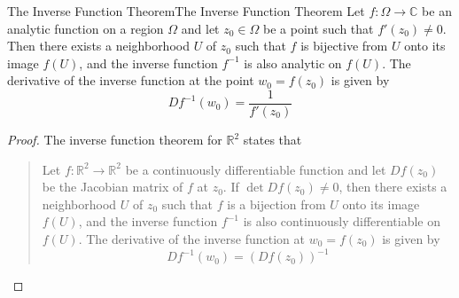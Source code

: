 \documentclass[../main.tex]{subfiles}
\begin{document}
\begin{theorem}{The Inverse Function Theorem}{The Inverse Function Theorem}
	Let $f: \Omega \rightarrow \mathbb{C}$ be an analytic function on a region $\Omega$ and let $z_0\in\Omega$ be a point such that $f'(z_0) \neq 0$. Then there exists a neighborhood $U$ of $z_0$ such that $f$ is bijective from $U$ onto its image $f(U)$, and the inverse function $f^{-1}$ is also analytic on $f(U)$. The derivative of the inverse function at the point $w_0 = f(z_0)$ is given by
	\begin{equation*}
		Df^{-1}(w_0) = \frac{1}{f'(z_0)}
	\end{equation*}
\end{theorem}
\begin{proof}
	The inverse function theorem for $\mathbb{R}^2$ states that
	\begin{quote}
		Let $f: \mathbb{R}^2 \rightarrow \mathbb{R}^2$ be a continuously differentiable function and let $Df(z_0)$ be the Jacobian matrix of $f$ at $z_0$. If $\det Df(z_0) \neq 0$, then there exists a neighborhood $U$ of $z_0$ such that $f$ is a bijection from $U$ onto its image $f(U)$, and the inverse function $f^{-1}$ is also continuously differentiable on $f(U)$. The derivative of the inverse function at $w_0 = f(z_0)$ is given by
		\begin{equation*}
			Df^{-1}(w_0) = \left( Df(z_0) \right)^{-1}
		\end{equation*}
	\end{quote}


\end{proof}
\end{document}
